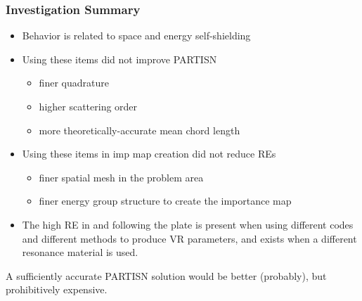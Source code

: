 \documentclass[xcolor=x11names,compress]{beamer}
\renewcommand{\(}{\begin{columns}}
\renewcommand{\)}{\end{columns}}
\newcommand{\<}[1]{\begin{column}{#1}}
\renewcommand{\>}{\end{column}}
\begin{document}
\begin{frame}[fragile]
  \frametitle{Investigation Summary}
  
	\begin{itemize}
	\item Behavior is related to space and energy self-shielding
	
	\item Using these items did not improve PARTISN
	 \begin{itemize}
	 \item finer quadrature
	 \item higher scattering order
	 \item more theoretically-accurate mean chord length
	 \end{itemize}
	 
	\item Using these items in imp map creation did not reduce REs
	 \begin{itemize}
	 \item finer spatial mesh in the problem area
	 \item finer energy group structure to create the importance map
	 \end{itemize}
	 
	\item The high RE in and following the plate is present when using different codes and different methods to produce VR parameters, and exists when a different resonance material is used.
	\end{itemize}


A sufficiently accurate PARTISN solution would be better (probably), but prohibitively expensive.
  
\end{frame}
\end{document}
